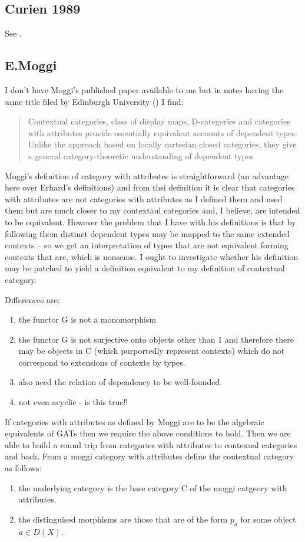 \documentclass[10pt,a4paper]{article}
\begin{document}
\subsection{Curien 1989}
See \cite{curien89}.

\subsection{E.Moggi} 
I don't have Moggi's published paper \cite{moggi91} available to me but in notes having the same  title filed by Edinburgh University (\cite{moggi94}) I find:
\begin{quote}
Contextual categories, class of display maps, D-categories and categories with
attributes provide essentially equivalent accounts of dependent types. Unlike
the approach based on locally cartesian closed categories, they give a general
category-theoretic understanding of dependent types
\end{quote}

Moggi's definition of category with attributes is straightforward (an advantage here over Erhard's definitions) and from thsi definition it is clear that categories with attributes are not categories with attributes as I defined them and used them but are much closer to my contextaul categories
and, I believe,  are intended to be equivalent. However the problem that I have with his definitions
is  that by following them distinct dependent types may be mapped to the same extended contexts -- so we get an interpretation of types that are not equivalent forming contexts that are,  which is nonsense.  I ought to investigate whether his definition may be patched to yield a definition equivalent to my definition of contextual category.

\noindent
Differences are:
\begin{enumerate}
\item the functor G is not a monomorphism
\item the functor G is not surjective onto objects other than 1 and therefore there may be objects in C (which purportedly represent contexts) which do not correspond to extensions of contexts by types. 
\item also need the relation of dependency to be well-founded.
\item not even acyclic - is this true!!
\end{enumerate}

\noindent
If categories with attributes as defined by Moggi are to be the algebraic equivalents of GATs then we require the above conditions to hold. Then we are able to build a round trip
 from categories with 
attributes to contexual categories and back. 
\noindent From a moggi category with attributes define the contextual category as follows:
\begin{enumerate}
\item the underlying category is the base category C of the moggi catgeory with attributes.
\item the distinguised morphisms are those that are of the form $p_a$ for some object $a \in D(X)$.
\end{enumerate}
\end{document}
